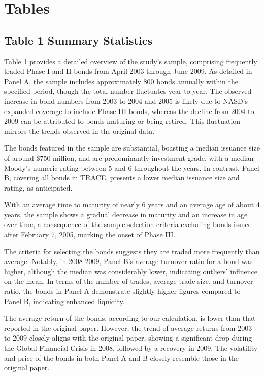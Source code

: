 \documentclass{article}
\begin{document}
\section{Tables}

\subsection{Table 1 Summary Statistics}

Table 1 provides a detailed overview of the study's sample, comprising frequently traded Phase I and II bonds from April 2003 through June 2009. As detailed in Panel A, the sample includes approximately 800 bonds annually within the specified period, though the total number fluctuates year to year. The observed increase in bond numbers from 2003 to 2004 and 2005 is likely due to NASD's expanded coverage to include Phase III bonds, whereas the decline from 2004 to 2009 can be attributed to bonds maturing or being retired. This fluctuation mirrors the trends observed in the original data.

The bonds featured in the sample are substantial, boasting a median issuance size of around \$750 million, and are predominantly investment grade, with a median Moody’s numeric rating between 5 and 6 throughout the years. In contrast, Panel B, covering all bonds in TRACE, presents a lower median issuance size and rating, as anticipated.

With an average time to maturity of nearly 6 years and an average age of about 4 years, the sample shows a gradual decrease in maturity and an increase in age over time, a consequence of the sample selection criteria excluding bonds issued after February 7, 2005, marking the onset of Phase III.

The criteria for selecting the bonds suggests they are traded more frequently than average. Notably, in 2008-2009, Panel B's average turnover ratio for a bond was higher, although the median was considerably lower, indicating outliers' influence on the mean. In terms of the number of trades, average trade size, and turnover ratio, the bonds in Panel A demonstrate slightly higher figures compared to Panel B, indicating enhanced liquidity.

The average return of the bonds, according to our calculation, is lower than that reported in the original paper. However, the trend of average returns from 2003 to 2009 closely aligns with the original paper, showing a significant drop during the Global Financial Crisis in 2008, followed by a recovery in 2009. The volatility and price of the bonds in both Panel A and B closely resemble those in the original paper.
\end{document}
